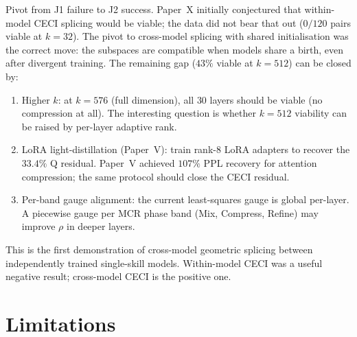 \documentclass[11pt]{article}
\begin{document}
Pivot from J1 failure to J2 success. Paper~X initially conjectured
that within-model CECI splicing would be viable; the data did not
bear that out ($0/120$ pairs viable at $k{=}32$). The pivot to
cross-model splicing with shared initialisation was the correct
move: the subspaces are compatible when models share a birth, even
after divergent training. The remaining gap ($43\%$ viable at $k{=}512$)
can be closed by:
\begin{enumerate}
\item Higher $k$: at $k{=}576$ (full dimension), all $30$ layers
 should be viable (no compression at all). The interesting question is
 whether $k{=}512$ viability can be raised by per-layer adaptive rank.
\item LoRA light-distillation (Paper~V): train rank-$8$ LoRA
 adapters to recover the $33.4\%$ Q residual. Paper~V achieved
 $107\%$ PPL recovery for attention compression; the same protocol
 should close the CECI residual.
\item Per-band gauge alignment: the current least-squares gauge is
 global per-layer. A piecewise gauge per MCR phase band (Mix,
 Compress, Refine) may improve $\rho$ in deeper layers.
\end{enumerate}

This is the first demonstration of cross-model geometric splicing
between independently trained single-skill models. Within-model CECI was
a useful negative result; cross-model CECI is the positive one.

\section{Limitations}
\label{sec:limits}
\end{document}
